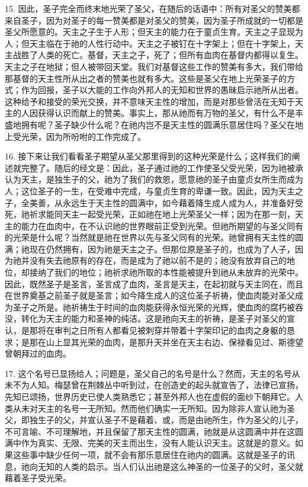 15. 因此，圣子完全而终末地光荣了圣父，在随后的话语中：所有对圣父的赞美都来自圣子，因为对圣子的每一赞美都是对圣父的赞美，因为圣子所成就的一切都是圣父所愿意的。天主之子生于人形；但天主的能力在于童贞生育。天主之子显现为人；但天主临在于祂的人性行动中。天主之子被钉在十字架上；但在十字架上，天主战胜了人类的死亡。基督，天主之子，死了；但所有血肉在基督内都得以复生。天主之子在地狱；但人被带回天堂。我们对基督这些工作的赞美有多大，我们带给那基督的天主性所从出之者的赞美也就有多大。这些是圣父在地上光荣圣子的方式；作为回报，圣子以大能的工作向外邦人的无知和世界的愚昧启示祂所从出者。这种给予和接受的荣光交换，并不意味天主性的增加，而是对那些曾活在无知于天主的人因获得认识而献上的赞美。事实上，那从祂而有万物的圣父，有什么不是丰盛地拥有呢？圣子缺少什么呢？在祂内岂不是天主性的圆满乐意居住吗？圣父在地上受光荣，因为所吩咐的工作完成了。\par

16. 接下来让我们看看圣子期望从圣父那里得到的这种光荣是什么；这样我们的阐述就完整了。随后的经文是：因此，圣子通过祂的工作使圣父受光荣，因为祂被承认为天主，是独生子的父，祂为了我们的救恩，愿意祂的圣子由童贞女所生而成为人；这位圣子的一生，在受难中完成，与童贞生育的卑谦一致。因此，因为天主之子，全美善，从永远生于天主性的圆满中，如今藉着降生成人成为人，并准备好受死，祂祈求能同天主一起受光荣，正如祂在地上光荣圣父一样；因为在那一刻，天主的能力在血肉中，在不认识祂的世界眼前正受到光荣。但祂所期望的与圣父同有的光荣是什么呢？当然就是祂在世界以先与圣父同有的光荣。祂曾拥有天主性的圆满；祂现在仍然拥有，因为祂是天主之子。但那位原是圣子的，也成为了人子，因为祂并没有失去祂原有的存在，而是成为了祂以前不是的；祂没有放弃自己的地位，却接纳了我们的地位；祂祈求祂所取的本性能被提升到祂从未放弃的光荣中。因此，既然圣子是圣言，圣言成了血肉，圣言是天主，在起初就与天主同在，而且在世界奠基之前圣子就是圣言；如今降生成人的这位圣子祈祷，使血肉能对圣父成为圣子之所是。祂祈祷生于时间的血肉能获得永恒光荣的光辉，使血肉的腐朽被吞没，转化为天主的能力和圣神的纯洁。这是祂向天主的祈祷，是圣子对圣父的宣认，是那将在审判之日所有人都看见被刺穿并带着十字架印记的血肉之身躯的恳求；是那在山上显其光荣的血肉，是那升天并坐在天主右边、保禄看见过、斯德望曾朝拜过的血肉。\par

17. 这个名号已显扬给人；问题是，圣父自己的名号是什么？然而，天主的名号从未不为人知。梅瑟曾在荆棘丛中听到过，在创造史的起头就宣告了，法律已宣扬，先知已颂扬，世界历史已使人类熟悉它；甚至外邦人也在虚假的面纱下朝拜它。人类从未对天主的名号一无所知。然而他们确实一无所知。因为除非人宣认祂为圣父，即独生子的父，并宣认圣子不是藉着、或，而是由祂所生，作为圣父的儿子，不可言喻、不可理解地，并且保留了那天主性的圆满，祂就是从这圆满中并在这圆满中作为真实、无限、完美的天主而出生，没有人能认识天主。这就是的意义。如果这些事中缺少任何一项，就不会有那乐意居住在祂内的圆满。这就是圣子的讯息，祂向无知的人类的启示。当人们认出祂是这么神圣的一位圣子的父时，圣父就藉着圣子受光荣。\par

